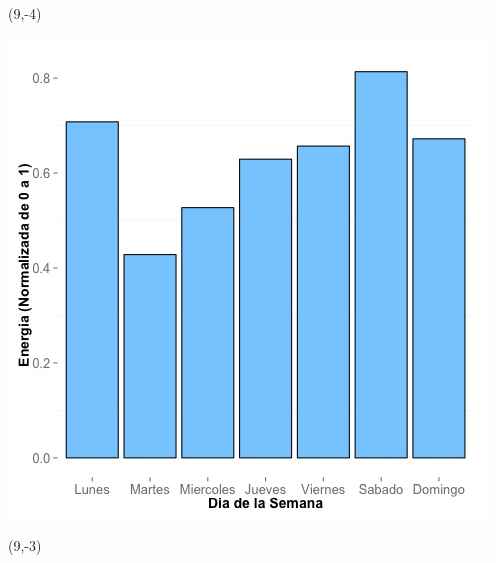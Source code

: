\documentclass{article}\usepackage[]{graphicx}\usepackage[]{color}
\newenvironment{knitrout}{}{} %
\begin{document}
 \begin{textblock}{1}(9,-4)
\begin{minipage}{20em}
\begingroup

\endgroup
\end{minipage}
\end{textblock}


\begin{knitrout}
\color{fgcolor}
\includegraphics[scale=0.65]{figure/A5_day_of_week_plot} 
\end{knitrout}


 \begin{textblock}{1}(9,-3)
\begin{minipage}{20em}
\begingroup

\endgroup
\end{minipage}
\end{textblock}
\end{document}
